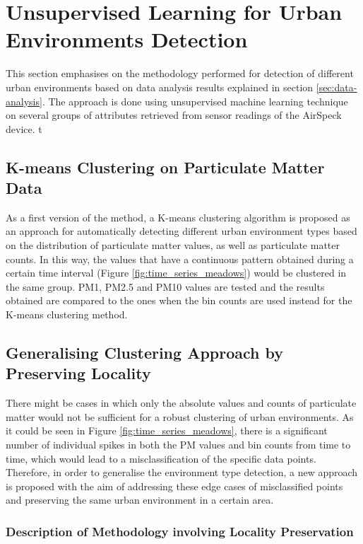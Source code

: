 \documentclass[bsc,frontabs,twoside,singlespacing, parskip,deptreport]{infthesis}     %
\begin{document}
\section{Unsupervised Learning for Urban Environments Detection}

This section emphasises on the methodology performed for detection of different urban environments based on data analysis results explained in section \ref{sec:data-analysis}. The approach is done using unsupervised machine learning technique on several groups of attributes retrieved from sensor readings of the AirSpeck device.
t
\subsection{K-means Clustering on Particulate Matter Data}
\label{subsec:k-means-methodology}

As a first version of the method, a K-means clustering algorithm is proposed as an approach for automatically detecting different urban environment types based on the distribution of particulate matter values, as well as particulate matter counts. In this way, the values that have a continuous pattern obtained during a certain time interval (Figure \ref{fig:time_series_meadows}) would be clustered in the same group. PM1, PM2.5 and PM10 values are tested and the results obtained are compared to the ones when the bin counts are used instead for the K-means clustering method.

\subsection{Generalising Clustering Approach by Preserving Locality}
\label{subsec:generic-clustering}

There might be cases in which only the absolute values and counts of particulate matter would not be sufficient for a robust clustering of urban environments. As it could be seen in Figure \ref{fig:time_series_meadows}, there is a significant number of individual spikes in both the PM values and bin counts  from time to time, which would lead to a misclassification of the specific data points. Therefore, in order to generalise the environment type detection, a new approach is proposed with the aim of addressing these edge cases of misclassified points and preserving the same urban environment in a certain area. 

\subsubsection*{Description of Methodology involving Locality Preservation}
\end{document}
